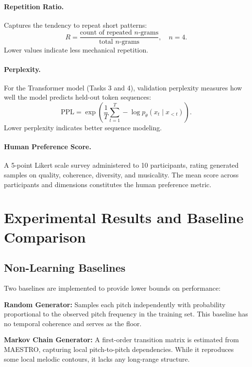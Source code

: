 \documentclass{article}
\begin{document}
\paragraph{Repetition Ratio.}
Captures the tendency to repeat short patterns:
\begin{equation}
  R = \frac{\text{count of repeated }n\text{-grams}}{\text{total }n\text{-grams}}, \quad n = 4.
\end{equation}
Lower values indicate less mechanical repetition.

\paragraph{Perplexity.}
For the Transformer model (Tasks 3 and 4), validation perplexity measures how well the model predicts held-out token sequences:
\begin{equation}
  \mathrm{PPL} = \exp\!\left(\frac{1}{T} \sum_{t=1}^{T} -\log p_\theta(x_t \mid x_{<t})\right).
\end{equation}
Lower perplexity indicates better sequence modeling.

\paragraph{Human Preference Score.}
A 5-point Likert scale survey administered to 10 participants, rating generated samples on quality, coherence, diversity, and musicality. The mean score across participants and dimensions constitutes the human preference metric.

\section{Experimental Results and Baseline Comparison}
\label{sec:results}

\subsection{Non-Learning Baselines}

Two baselines are implemented to provide lower bounds on performance:

\textbf{Random Generator:} Samples each pitch independently with probability proportional to the observed pitch frequency in the training set. This baseline has no temporal coherence and serves as the floor.

\textbf{Markov Chain Generator:} A first-order transition matrix is estimated from MAESTRO, capturing local pitch-to-pitch dependencies. While it reproduces some local melodic contours, it lacks any long-range structure.
\end{document}
